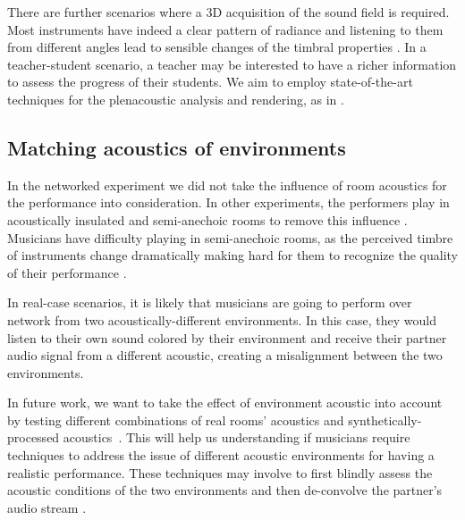There are further scenarios where a 3D acquisition of the sound field is required.  Most instruments have indeed a clear pattern of radiance and listening to them from different angles lead to sensible changes of the timbral properties \cite{CancliniAES}. In a teacher-student scenario, a teacher may be interested to have a richer information to assess the progress of their students. We aim to employ state-of-the-art techniques for the plenacoustic analysis and rendering, as in \cite{Canclini2015}.


\subsection{Matching acoustics of environments}
In the networked experiment we did not take the influence of room acoustics for the performance into consideration. In other experiments, the performers play in acoustically insulated and semi-anechoic rooms to remove this influence \cite{RottondiFeature}. Musicians have difficulty playing in semi-anechoic rooms, as the perceived timbre of instruments change dramatically making hard for them to recognize the quality of their performance \cite{Woszczyk2009}.

In real-case scenarios, it is likely that musicians are going to perform over network from two acoustically-different environments. In this case, they would listen to their own sound colored by their environment and receive their partner audio signal from a different acoustic, creating a misalignment between the two environments.

In future work, we want to take the effect of environment acoustic into account by testing different combinations of real rooms' acoustics and synthetically-processed acoustics~\cite{Boucher15}. This will help us understanding if musicians require techniques to address the issue of different acoustic environments for having a realistic performance. These techniques may involve to first blindly assess the acoustic conditions of the two environments and then de-convolve the partner's audio stream \cite{CancliniRoom}.



